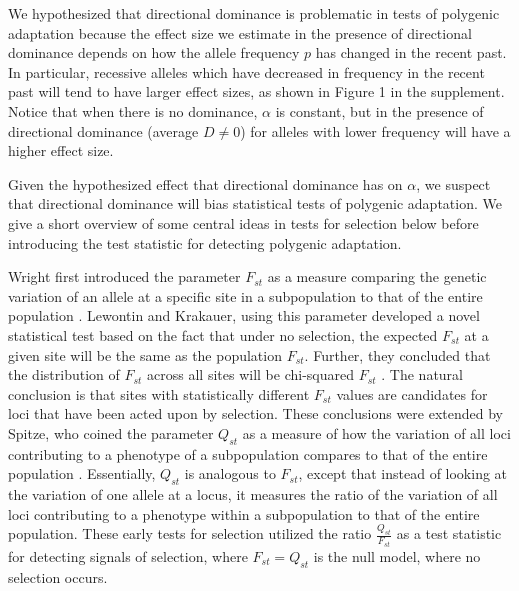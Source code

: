 \documentclass[a4paper,12pt]{article}
\begin{document}
We hypothesized that directional dominance is problematic in tests of polygenic adaptation
because the effect size we estimate in the presence of directional
dominance depends on how the allele frequency $p$ has changed in the
recent past. In particular, recessive alleles which have decreased in frequency
in the recent past will tend to have larger effect sizes, as shown in
Figure 1 in the supplement. Notice that when there is no dominance,
$\alpha$ is constant, but in the presence of directional dominance
(average $D\neq0$) for alleles with lower frequency will have a higher
effect size. 

Given the hypothesized effect that directional dominance has on
$\alpha$, we suspect that directional dominance will bias statistical
tests of polygenic adaptation. We give a short overview of some
central ideas in tests for selection below before introducing the test
statistic for detecting polygenic adaptation.

Wright first introduced the parameter $F_{st}$ as a measure comparing
the genetic variation of an allele at a specific site in a subpopulation to that of the entire population
\cite{Fst}. Lewontin and Krakauer, using this parameter developed a
novel statistical test based on the fact
that under no selection, the expected $F_{st}$ at a given site will be the same
as the population $F_{st}$. Further, they concluded that the
distribution of $F_{st}$ across all sites will be chi-squared
$F_{st}$ \cite{firstseltest}. The natural conclusion is that sites
with statistically different $F_{st}$ values are candidates for loci
that have been acted upon by selection. These conclusions were extended by Spitze, who coined the
parameter $Q_{st}$ as a measure of how the variation of all loci
contributing to a phenotype of a subpopulation compares to that of the entire
population \cite{Qst}. Essentially, $Q_{st}$ is analogous to $F_{st}$,
except that instead of looking at the variation of one allele at a
locus, it measures the ratio of the variation of all loci contributing to a
phenotype within a subpopulation to that of the entire population. These early tests for selection utilized the ratio
$\frac{Q_{st}}{F_{st}}$ as a test statistic for detecting signals of
selection, where $F_{st} = Q_{st}$ is the null model, where no
selection occurs.
\end{document}
